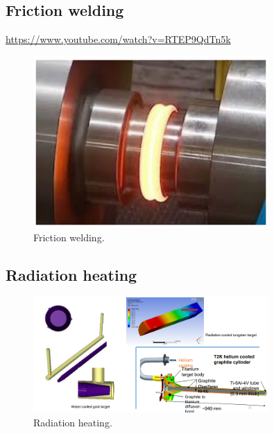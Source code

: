 \subsection{Friction welding}
\url{https://www.youtube.com/watch?v=RTEP9QdTn5k}
\begin{figure}[H]
    \centering
    \includegraphics[width = 0.8\textwidth]{img/figure44.png}
    \caption{Friction welding.}
\end{figure}
\subsection{Radiation heating}
\begin{figure}[H]
    \centering
    \includegraphics[width = 0.8\textwidth]{img/figure42.png}
    \caption{Radiation heating.}
\end{figure}
